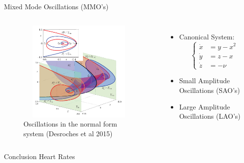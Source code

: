 \documentclass[11pt]{beamer}
\begin{document}
\begin{frame}{Mixed Mode Oscillations (MMO's)}
\begin{columns}
	\begin{figure}
		
		\includegraphics[height=5cm,width=6cm]{Images/MMO-spirals}
		\caption{Oscillations in the normal form system (Desroches et al 2015)}
		
	\end{figure}
	\begin{itemize}
		\item Canonical System:
		\begin{equation*}
			 \begin{cases}
			\dot{x}&=y-x^2\\
			\dot{y}&=z-x\\
			\dot{z}&=-\nu
			\end{cases} 
		\end{equation*}
		\item Small Amplitude Oscillations (SAO's)
		\item Large Amplitude Oscillations (LAO's)
		
		
	\end{itemize}
\end{columns}
\end{frame}

\begin{frame}{Conclusion}
Heart Rates
\end{frame}
\end{document}
